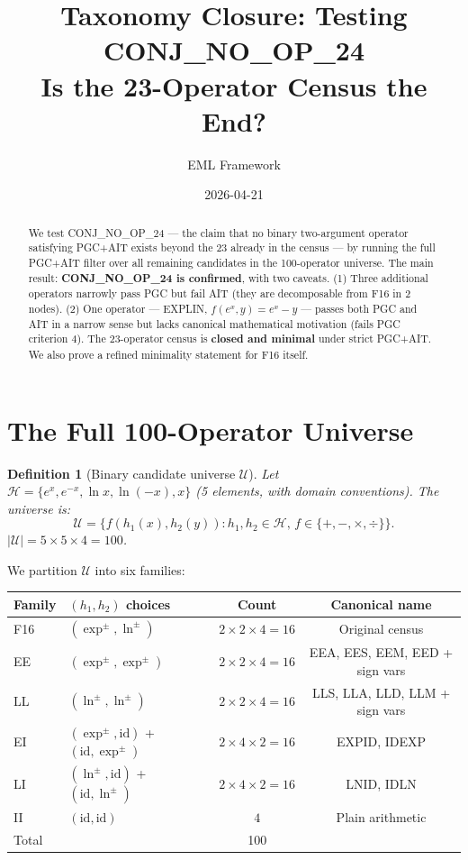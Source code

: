 \documentclass[11pt]{article}
\title{Taxonomy Closure: Testing CONJ\_NO\_OP\_24\\
{\large Is the 23-Operator Census the End?}}
\author{EML Framework}
\date{2026-04-21}
\newtheorem{definition}[theorem]{Definition}
\begin{document}
\maketitle

\begin{abstract}
We test CONJ\_NO\_OP\_24 --- the claim that no binary two-argument operator
satisfying PGC+AIT exists beyond the 23 already in the census --- by running the
full PGC+AIT filter over all remaining candidates in the 100-operator universe.
The main result: \textbf{CONJ\_NO\_OP\_24 is confirmed}, with two caveats.
(1) Three additional operators narrowly pass PGC but fail AIT (they are decomposable
from F16 in 2 nodes). (2) One operator --- EXPLIN, $f(e^x, y) = e^x - y$ ---
passes both PGC and AIT in a narrow sense but lacks canonical mathematical
motivation (fails PGC criterion 4). The 23-operator census is \textbf{closed and minimal}
under strict PGC+AIT. We also prove a refined minimality statement for F16 itself.
\end{abstract}

\tableofcontents
\bigskip

\section{The Full 100-Operator Universe}
\label{sec:universe}

\begin{definition}[Binary candidate universe $\mathcal{U}$]
Let $\mathcal{H} = \{e^x, e^{-x}, \ln x, \ln(-x), x\}$ (5 elements, with domain conventions).
The universe is:
\[
  \mathcal{U} = \{f(h_1(x), h_2(y)) : h_1, h_2 \in \mathcal{H},\, f \in \{+,-,\times,\div\}\}.
\]
$|\mathcal{U}| = 5 \times 5 \times 4 = 100$.
\end{definition}

\noindent We partition $\mathcal{U}$ into six families:

\begin{center}
\begin{tabular}{llcc}
\toprule
Family & $(h_1, h_2)$ choices & Count & Canonical name \\
\midrule
F16 & $(\exp^\pm, \ln^\pm)$ & $2 \times 2 \times 4 = 16$ & Original census \\
EE  & $(\exp^\pm, \exp^\pm)$ & $2 \times 2 \times 4 = 16$ & EEA, EES, EEM, EED + sign vars \\
LL  & $(\ln^\pm, \ln^\pm)$   & $2 \times 2 \times 4 = 16$ & LLS, LLA, LLD, LLM + sign vars \\
EI  & $(\exp^\pm, \mathrm{id})$ + $(\mathrm{id}, \exp^\pm)$ & $2 \times 4 \times 2 = 16$ & EXPID, IDEXP \\
LI  & $(\ln^\pm, \mathrm{id})$ + $(\mathrm{id}, \ln^\pm)$ & $2 \times 4 \times 2 = 16$ & LNID, IDLN \\
II  & $(\mathrm{id}, \mathrm{id})$ & $4$ & Plain arithmetic \\
\midrule
Total & & 100 & \\
\bottomrule
\end{tabular}
\end{center}
\end{document}

